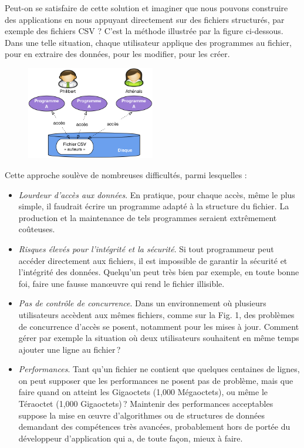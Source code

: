 \documentclass[
  a4paper,
  DIV=11,
  numbers=noendperiod]{scrartcl}
\providecommand{\tightlist}{%
  \setlength{\itemsep}{0pt}\setlength{\parskip}{0pt}}\usepackage{longtable,booktabs,array}
\begin{document}
Peut-on se satisfaire de cette solution et imaginer que nous pouvons
construire des applications en nous appuyant directement sur des
fichiers structurés, par exemple des fichiers CSV ? C'est la méthode
illustrée par la figure ci-dessous. Dans une telle situation, chaque
utilisateur applique des programmes au fichier, pour en extraire des
données, pour les modifier, pour les créer.

\begin{figure}

{\centering \includegraphics[width=0.5\textwidth,height=\textheight]{BDD1.png}

}

\end{figure}

Cette approche soulève de nombreuses difficultés, parmi lesquelles :

\begin{itemize}
\tightlist
\item
  \emph{Lourdeur d'accès aux données}. En pratique, pour chaque accès,
  même le plus simple, il faudrait écrire un programme adapté à la
  structure du fichier. La production et la maintenance de tels
  programmes seraient extrêmement coûteuses.
\item
  \emph{Risques élevés pour l'intégrité et la sécurité}. Si tout
  programmeur peut accéder directement aux fichiers, il est impossible
  de garantir la sécurité et l'intégrité des données. Quelqu'un peut
  très bien par exemple, en toute bonne foi, faire une fausse manœuvre
  qui rend le fichier illisible.
\item
  \emph{Pas de contrôle de concurrence}. Dans un environnement où
  plusieurs utilisateurs accèdent aux mêmes fichiers, comme sur la Fig.
  1, des problèmes de concurrence d'accès se posent, notamment pour les
  mises à jour. Comment gérer par exemple la situation où deux
  utilisateurs souhaitent en même temps ajouter une ligne au fichier\,?
\item
  \emph{Performances}. Tant qu'un fichier ne contient que quelques
  centaines de lignes, on peut supposer que les performances ne posent
  pas de problème, mais que faire quand on atteint les Gigaoctets (1,000
  Mégaoctets), ou même le Téraoctet (1,000 Gigaoctets)\,? Maintenir des
  performances acceptables suppose la mise en œuvre d'algorithmes ou de
  structures de données demandant des compétences très avancées,
  probablement hors de portée du développeur d'application qui a, de
  toute façon, mieux à faire.
\end{itemize}
\end{document}
